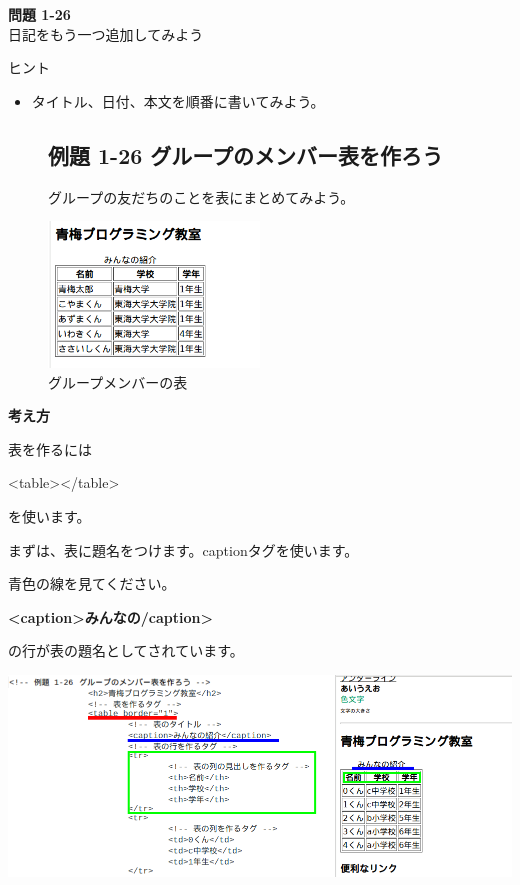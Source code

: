 \noindent \textbf{問題 1-26}\\
日記をもう一つ追加してみよう

ヒント

\begin{itemize}
  \item
        タイトル、日付、本文を順番に書いてみよう。
\end{itemize}
\clearpage




\centering
\begin{figure}
  \subsection{例題 1-26 グループのメンバー表を作ろう}
  グループの友だちのことを表にまとめてみよう。
  \begin{minipage}{\textwidth}
    {\upshape
      \includegraphics[width=0.5\textwidth]{text01-img/textbook-img189.png}
      \newline
      \caption{グループメンバーの表}
    }
  \end{minipage}    
\end{figure}

\bigskip

\flushleft
\textbf{考え方}



表を作るには

{\textless}table{\textgreater}{\textless}/table{\textgreater}

を使います。

まずは、表に題名をつけます。captionタグを使います。

青色の線を見てください。

\textbf{{\textless}caption{\textgreater}みんなの/caption{\textgreater}}

の行が表の題名としてされています。



\bigskip

\includegraphics[width=13.462cm]{text01-img/textbook-img190.png}


